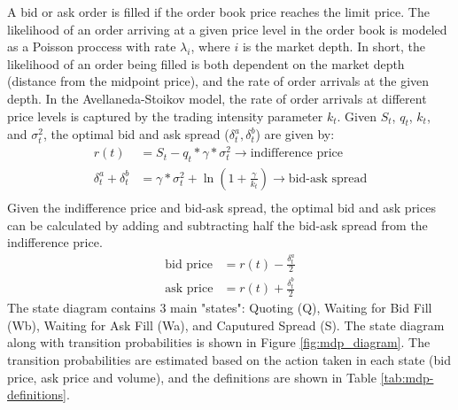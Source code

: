 \documentclass[letterpaper, 10 pt, conference]{ieeeconf}  %
\begin{document}
A bid or ask order is filled if the order book price reaches the limit price. The likelihood of an order arriving at a given price level in the order book is modeled as a Poisson proccess with rate $\lambda_i$, where $i$ is the market depth. In short, the likelihood of an order being filled is both dependent on the market depth (distance from the midpoint price), and the rate of order arrivals at the given depth. In the Avellaneda-Stoikov model, the rate of order arrivals at different price levels is captured by the trading intensity parameter $k_t$. Given $S_t$, $q_t$, $k_t$, and $\sigma^2_t$, the optimal bid and ask spread ($\delta^a_t, \delta^b_t$) are given by:
\begin{align*}
        r(t) &= S_t - q_t * \gamma * \sigma^2_t \rightarrow \text{indifference price} \\
        \delta^a_t + \delta^b_t &= \gamma*\sigma^2_t + \ln(1+\frac{\gamma}{k_t}) \rightarrow \text{bid-ask spread} \\
\end{align*}
Given the indifference price and bid-ask spread, the optimal bid and ask prices can be calculated by adding and subtracting half the bid-ask spread from the indifference price. 
\begin{align*}
        \text{bid price} &= r(t) - \frac{\delta^a_t}{2} \\
        \text{ask price} &= r(t) + \frac{\delta^b_t}{2}
\end{align*}
The state diagram contains 3 main "states": Quoting (Q), Waiting for Bid Fill (Wb), Waiting for Ask Fill (Wa), and Caputured Spread (S). The state diagram along with transition probabilities is shown in Figure \ref{fig:mdp_diagram}. The transition probabilities are estimated based on the action taken in each state (bid price, ask price and volume), and the definitions are shown in Table \ref{tab:mdp-definitions}.        
\end{document}
